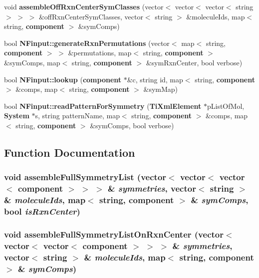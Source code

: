 \begin{CompactItemize}
\item 
void {\bf assembleOffRxnCenterSymClasses} (vector$<$ vector$<$ vector$<$ string $>$ $>$ $>$ \&offRxnCenterSymClasses, vector$<$ string $>$ \&moleculeIds, map$<$ string, {\bf component} $>$ \&symComps)
\item 
bool {\bf NFinput::generateRxnPermutations} (vector$<$ map$<$ string, {\bf component} $>$ $>$ \&permutations, map$<$ string, {\bf component} $>$ \&symComps, map$<$ string, {\bf component} $>$ \&symRxnCenter, bool verbose)
\item 
bool {\bf NFinput::lookup} ({\bf component} $\ast$\&c, string id, map$<$ string, {\bf component} $>$ \&comps, map$<$ string, {\bf component} $>$ \&symMap)
\item 
bool {\bf NFinput::readPatternForSymmetry} ({\bf TiXmlElement} $\ast$pListOfMol, {\bf System} $\ast$s, string patternName, map$<$ string, {\bf component} $>$ \&comps, map$<$ string, {\bf component} $>$ \&symComps, bool verbose)
\end{CompactItemize}


\subsection{Function Documentation}
\subsubsection{\setlength{\rightskip}{0pt plus 5cm}void assembleFullSymmetryList (vector$<$ vector$<$ vector$<$ {\bf component} $>$ $>$ $>$ \& {\em symmetries}, vector$<$ string $>$ \& {\em moleculeIds}, map$<$ string, {\bf component} $>$ \& {\em symComps}, bool {\em isRxnCenter})}\label{parseSymRxns_8cpp_8ed01dd9fafee392be0b94f4165e2845}


\subsubsection{\setlength{\rightskip}{0pt plus 5cm}void assembleFullSymmetryListOnRxnCenter (vector$<$ vector$<$ vector$<$ {\bf component} $>$ $>$ $>$ \& {\em symmetries}, vector$<$ string $>$ \& {\em moleculeIds}, map$<$ string, {\bf component} $>$ \& {\em symComps})}\label{parseSymRxns_8cpp_3c707030d2dca5e048082385404d4a86}


